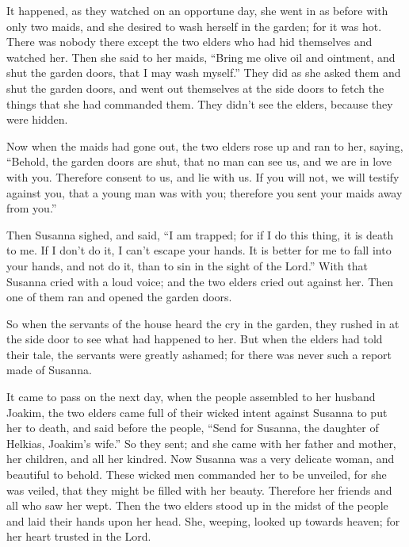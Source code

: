  It happened, as they watched on an opportune day, she went
in as before with only two maids, and she desired to wash herself in the
garden; for it was hot.  There was nobody there except the
two elders who had hid themselves and watched her.  Then
she said to her maids, ``Bring me olive oil and ointment, and shut the
garden doors, that I may wash myself.''  They did as she
asked them and shut the garden doors, and went out themselves at the
side doors to fetch the things that she had commanded them. They didn't
see the elders, because they were hidden.

 Now when the maids had gone out, the two elders rose up
and ran to her, saying,  ``Behold, the garden doors are
shut, that no man can see us, and we are in love with you. Therefore
consent to us, and lie with us.  If you will not, we will
testify against you, that a young man was with you; therefore you sent
your maids away from you.''

 Then Susanna sighed, and said, ``I am trapped; for if I do
this thing, it is death to me. If I don't do it, I can't escape your
hands.  It is better for me to fall into your hands, and
not do it, than to sin in the sight of the Lord.''  With
that Susanna cried with a loud voice; and the two elders cried out
against her.  Then one of them ran and opened the garden
doors.

 So when the servants of the house heard the cry in the
garden, they rushed in at the side door to see what had happened to her.
 But when the elders had told their tale, the servants were
greatly ashamed; for there was never such a report made of Susanna.

 It came to pass on the next day, when the people assembled
to her husband Joakim, the two elders came full of their wicked intent
against Susanna to put her to death,  and said before the
people, ``Send for Susanna, the daughter of Helkias, Joakim's wife.'' So
they sent;  and she came with her father and mother, her
children, and all her kindred.  Now Susanna was a very
delicate woman, and beautiful to behold.  These wicked men
commanded her to be unveiled, for she was veiled, that they might be
filled with her beauty.  Therefore her friends and all who
saw her wept.  Then the two elders stood up in the midst of
the people and laid their hands upon her head.  She,
weeping, looked up towards heaven; for her heart trusted in the Lord.

